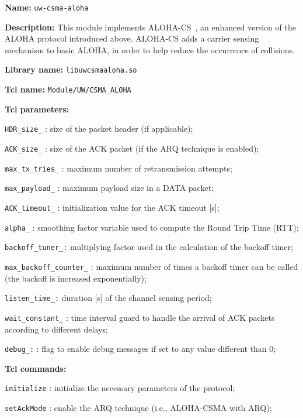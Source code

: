 \begin{description}
   \item {\bf Name:}  {\tt uw-csma-aloha}
   \item {\bf Description:} This module implements ALOHA-CS~\cite{GuoSingapore}, an enhanced version of the ALOHA protocol introduced above. ALOHA-CS adds a carrier sensing mechanism to basic ALOHA, in order to help reduce the occurrence of collisions.
   \item {\bf Library name:} {\tt libuwcsmaaloha.so}
   \item {\bf Tcl name:} {\tt Module/UW/CSMA\_ALOHA}
   \item {\bf Tcl parameters:} 
   \begin{description}
     \item {\tt HDR\_size\_} : size of the packet header (if applicable);
     \item {\tt ACK\_size\_} : size of the ACK packet (if the ARQ technique is enabled);
     \item {\tt max\_tx\_tries\_} : maximum number of retransmission attempts;
     \item {\tt max\_payload\_} : maximum payload size in a DATA packet;
     \item {\tt ACK\_timeout\_} : initialization value for the ACK timeout [s];
     \item {\tt alpha\_} : smoothing factor variable used to compute the Round Trip Time (RTT);
     \item {\tt backoff\_tuner\_:} multiplying factor used in the calculation of the backoff timer;   
     \item {\tt max\_backoff\_counter\_} : maximum number of times a backoff timer can be called (the backoff is increased exponentially);
     \item {\tt listen\_time\_:} duration [s] of the channel sensing period; 
     \item {\tt wait\_constant\_} : time interval guard to handle the arrival of ACK packets according to different delays;
     \item {\tt debug\_:} : flag to enable debug messages if set to any value different than $0$;
	\end{description}
   \item {\bf Tcl commands:}
   \begin{description}
      \item {\tt initialize} : initialize the necessary parameters of the protocol;
      \item {\tt setAckMode} : enable the ARQ technique (i.e., ALOHA-CSMA with ARQ);

\end{description}
\end{description}
